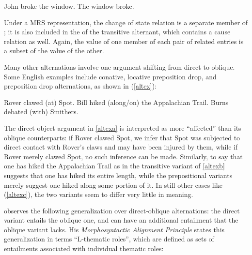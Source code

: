 \documentclass[output=paper
                ,modfonts
                ,nonflat
	        ,collection
	        ,collectionchapter
	        ,collectiontoclongg
 	        ,biblatex
                ,babelshorthands
                ,newtxmath
                ,draftmode
                ,colorlinks, citecolor=brown
]{./langsci/langscibook}
\begin{document}
\begin{exe}
\ex\label{caus-inch}
\begin{xlist}
	\ex\label{caus-inch-a}John broke the window.
	\ex\label{caus-inch-b}The window broke.
\end{xlist}	
\end{exe}

Under a MRS representation, the change of state relation is a separate member of \rels; it is also included in the \rels of the transitive alternant, which contains a cause relation as well.
Again, the \rels value of one member of each pair of related entries is a subset of the \rels value of the other.

Many other alternations involve one argument shifting from direct to oblique.
Some English examples include conative, locative preposition drop, and  preposition drop alternations, as shown in (\ref{altex}):

\begin{exe}\ex\label{altex}
\begin{xlist}
\ex \label{altexa} Rover clawed (at) Spot. 
\ex \label{altexb} Bill hiked (along/on) the Appalachian Trail.
\ex \label{altexc} Burns debated (with) Smithers.
\end{xlist}
\end{exe}

\noindent
The direct object argument in \ref{altexa} is interpreted as more ``affected'' than its oblique counterparts:  if Rover clawed Spot, we infer that Spot was subjected to direct contact with Rover's claws and may have been injured by them, while if Rover merely clawed  Spot, no such inference can be made.
Similarly, to say that one has hiked the Appalachian Trail as in the transitive variant of \ref{altexb} suggests that one has hiked its entire length, while the prepositional variants merely suggest one hiked along some portion of it.  In still other cases like (\ref{altexc}), the two variants seem to differ very little in meaning.  


\citet{Beavers2010} observes the following generalization over direct-oblique alternations:  the direct variant entails the oblique one, and can have an additional entailment that the oblique variant lacks.  
His \emph{Morphosyntactic Alignment Principle}  states this generalization in terms ``L-thematic roles'', which are defined as sets of entailments associated with individual thematic roles:   
\end{document}
